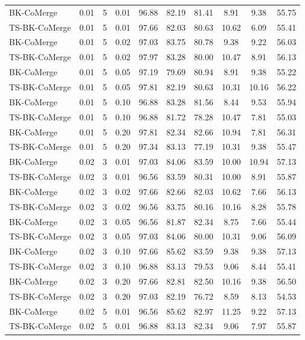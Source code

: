\documentclass{article}
\theoremstyle{plain}
\theoremstyle{definition}
\theoremstyle{remark}
\begin{document}
\begin{table}[h]
\begin{center}
\begin{small}
\begin{tabular}{lccccccccc}
\midrule
BK-CoMerge & 0.01 & 5 & 0.01 & 96.88 & 82.19 & 81.41 & 8.91 & 9.38 & 55.75 \\
TS-BK-CoMerge & 0.01 & 5 & 0.01 & 97.66 & 82.03 & 80.63 & 10.62 & 6.09 & 55.41 \\
BK-CoMerge & 0.01 & 5 & 0.02 & 97.03 & 83.75 & 80.78 & 9.38 & 9.22 & 56.03 \\
TS-BK-CoMerge & 0.01 & 5 & 0.02 & 97.97 & 83.28 & 80.00 & 10.47 & 8.91 & 56.13 \\
BK-CoMerge & 0.01 & 5 & 0.05 & 97.19 & 79.69 & 80.94 & 8.91 & 9.38 & 55.22 \\
TS-BK-CoMerge & 0.01 & 5 & 0.05 & 97.81 & 82.19 & 80.63 & 10.31 & 10.16 & 56.22 \\
BK-CoMerge & 0.01 & 5 & 0.10 & 96.88 & 83.28 & 81.56 & 8.44 & 9.53 & 55.94 \\
TS-BK-CoMerge & 0.01 & 5 & 0.10 & 96.88 & 81.72 & 78.28 & 10.47 & 7.81 & 55.03 \\
BK-CoMerge & 0.01 & 5 & 0.20 & 97.81 & 82.34 & 82.66 & 10.94 & 7.81 & 56.31 \\
TS-BK-CoMerge & 0.01 & 5 & 0.20 & 97.34 & 83.13 & 77.19 & 10.31 & 9.38 & 55.47 \\
\midrule
BK-CoMerge & 0.02 & 3 & 0.01 & 97.03 & 84.06 & 83.59 & 10.00 & 10.94 & 57.13 \\
TS-BK-CoMerge & 0.02 & 3 & 0.01 & 96.56 & 83.59 & 80.31 & 10.00 & 8.91 & 55.87 \\
BK-CoMerge & 0.02 & 3 & 0.02 & 97.66 & 82.66 & 82.03 & 10.62 & 7.66 & 56.13 \\
TS-BK-CoMerge & 0.02 & 3 & 0.02 & 96.56 & 83.75 & 80.16 & 10.16 & 8.28 & 55.78 \\
BK-CoMerge & 0.02 & 3 & 0.05 & 96.56 & 81.87 & 82.34 & 8.75 & 7.66 & 55.44 \\
TS-BK-CoMerge & 0.02 & 3 & 0.05 & 97.03 & 84.06 & 80.00 & 10.31 & 9.06 & 56.09 \\
BK-CoMerge & 0.02 & 3 & 0.10 & 97.66 & 85.62 & 83.59 & 9.38 & 9.38 & 57.13 \\
TS-BK-CoMerge & 0.02 & 3 & 0.10 & 96.88 & 83.13 & 79.53 & 9.06 & 8.44 & 55.41 \\
BK-CoMerge & 0.02 & 3 & 0.20 & 97.66 & 82.81 & 82.50 & 10.16 & 9.38 & 56.50 \\
TS-BK-CoMerge & 0.02 & 3 & 0.20 & 97.03 & 82.19 & 76.72 & 8.59 & 8.13 & 54.53 \\
\midrule
BK-CoMerge & 0.02 & 5 & 0.01 & 96.56 & 85.62 & 82.97 & 11.25 & 9.22 & 57.13 \\
TS-BK-CoMerge & 0.02 & 5 & 0.01 & 96.88 & 83.13 & 82.34 & 9.06 & 7.97 & 55.87 \\

\end{tabular}
\end{small}
\end{center}
\end{table}
\end{document}
